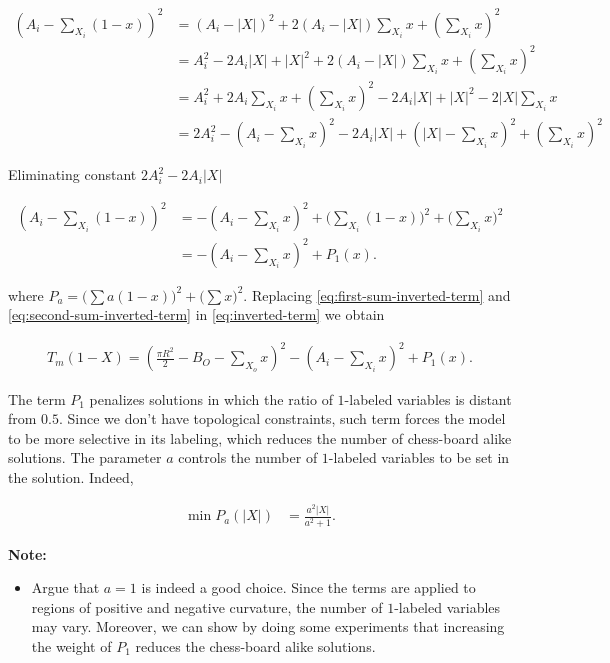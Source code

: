 \begin{align*}
	(A_i - \sum_{X_i}{(1-x)})^2 &= (A_i - |X|)^2 + 2(A_i-|X|)\sum_{X_i}{x} + ( \sum_{X_i}{x} )^2 \\
	&= A_i^2 -2A_i|X| + |X|^2 + 2(A_i - |X|)\sum_{X_i}{x} + (\sum_{X_i}{x})^2  \\
	&= A_i^2 + 2A_i\sum_{X_i}{x} + (\sum_{X_i}{x})^2 - 2A_i|X| + |X|^2 - 2|X|\sum_{X_i}{x} \\
	&= 2A_i^2 - (A_i - \sum_{X_i}{x})^2 -2A_i|X| + (|X| - \sum_{X_i}{x})^2 + (\sum_{X_i}{x})^2
\end{align*}

Eliminating constant $2A_i^2 - 2A_i|X|$
	
\begin{align}
	(A_i - \sum_{X_i}{(1-x)})^2 &= - (A_i - \sum_{X_i}{x})^2 + \Big( \sum_{X_i}{(1-x)} \Big)^2 + \Big(\sum_{X_i}{x}\Big)^2 \nonumber \\
	&= - (A_i - \sum_{X_i}{x})^2 + P_1(x).
	\label{eq:second-sum-inverted-term}
\end{align}

where  $P_a=\Big( \sum{a(1-x)} \Big)^2 + \Big(\sum{x}\Big)^2$. Replacing \eqref{eq:first-sum-inverted-term} and \eqref{eq:second-sum-inverted-term}  in \eqref{eq:inverted-term} we obtain

\begin{align}
	T_m(1-X) = (\frac{\pi R^2}{2} - B_O - \sum_{X_o}{x})^2 - (A_i - \sum_{X_i}{x})^2 + P_1(x).
\end{align}

The term $P_1$ penalizes solutions in which the ratio of $1$-labeled variables is distant from $0.5$. Since we don't have topological constraints, such term forces the model to be more selective in its labeling, which reduces the number of chess-board alike solutions. The parameter $a$ controls the number of $1$-labeled variables to be set in the solution. Indeed,

\begin{align*}
	\min P_a(|X|) &= \frac{a^2|X|}{a^2+1}.
\end{align*}

\textbf{Note:} 
\begin{itemize}
	\item{Argue that $a=1$ is indeed a good choice. Since the terms are applied to regions of positive and negative curvature, the number of $1$-labeled variables may vary. Moreover, we can show by doing some experiments that increasing the weight of $P_1$ reduces the chess-board alike solutions. }
\end{itemize}

